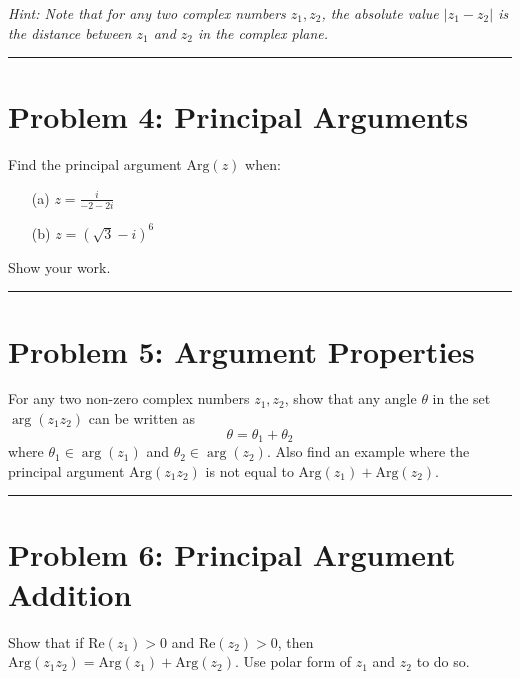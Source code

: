 \documentclass{article}
\begin{document}
\textit{Hint: Note that for any two complex numbers $z_1, z_2$, the absolute value $|z_1 - z_2|$ is the distance between $z_1$ and $z_2$ in the complex plane.}

\hrule

\newpage
\section*{Problem 4: Principal Arguments}
Find the principal argument $\text{Arg}(z)$ when:

\begin{enumerate}
    \item[(a)] $z = \frac{i}{-2-2i}$
    
    \vspace{.5cm} %
    
    \item[(b)] $z = (\sqrt{3}-i)^6$
    
    \vspace{.5cm} %
\end{enumerate}

Show your work.

\hrule

\newpage
\section*{Problem 5: Argument Properties}
For any two non-zero complex numbers $z_1, z_2$, show that any angle $\theta$ in the set $\arg{(z_1z_2)}$ can be written as
\[ \theta = \theta_1 + \theta_2 \]
where $\theta_1 \in \arg(z_1)$ and $\theta_2 \in \arg(z_2)$. Also find an example where the principal argument $\text{Arg} (z_1z_2)$ is not equal to $\text{Arg} (z_1) + \text{Arg} (z_2)$.

\vspace{.5cm} %

\hrule

\newpage
\section*{Problem 6: Principal Argument Addition}
Show that if $\text{Re}(z_1)>0$ and $\text{Re}(z_2)>0$, then $\text{Arg}(z_1z_2) = \text{Arg}(z_1)+\text{Arg}(z_2)$. Use polar form of $z_1$ and $z_2$ to do so.

\vspace{.5cm} %
\end{document}
